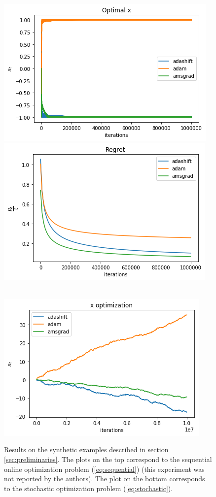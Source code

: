 \documentclass{article} %
\begin{document}
\begin{figure}[t]
    \centering
    \begin{minipage}{0.5\linewidth}
    \includegraphics[width=0.99\linewidth]{opt_synth}
    \end{minipage}\hfill
    \begin{minipage}{0.5\linewidth}
    \includegraphics[width=0.99\linewidth]{regret_synth}
    \end{minipage}\\
    \includegraphics[width=0.5\linewidth]{synth-stochastic}
    \caption{Results on the synthetic examples described
    in section \ref{sec:preliminaries}. The plots on
    the top correspond to the sequential online optimization problem (\ref{eq:sequential}) (this experiment was not reported by the authors). The plot on the bottom corresponds to the stochastic optimization problem (\ref{eq:stochastic}). }\label{fig:synthetic}
\end{figure}
\end{document}
